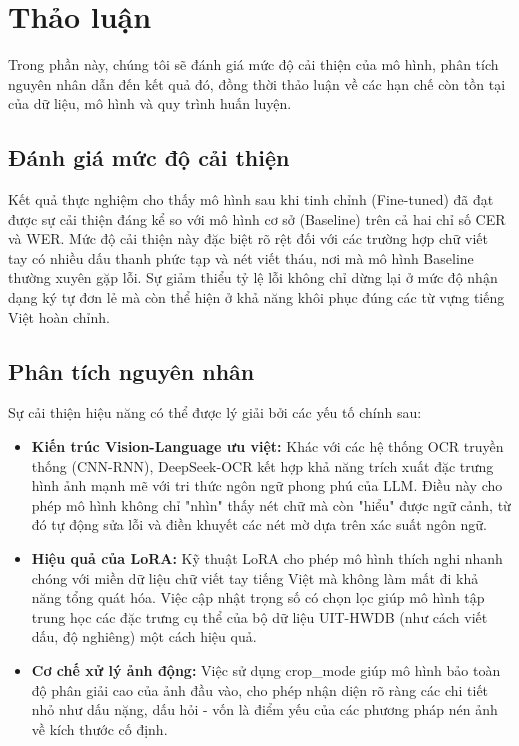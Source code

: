 \section{Thảo luận}

Trong phần này, chúng tôi sẽ đánh giá mức độ cải thiện của mô hình, phân tích nguyên nhân dẫn đến kết quả đó, đồng thời thảo luận về các hạn chế còn tồn tại của dữ liệu, mô hình và quy trình huấn luyện.

\subsection{Đánh giá mức độ cải thiện}

Kết quả thực nghiệm cho thấy mô hình sau khi tinh chỉnh (Fine-tuned) đã đạt được sự cải thiện đáng kể so với mô hình cơ sở (Baseline) trên cả hai chỉ số CER và WER. Mức độ cải thiện này đặc biệt rõ rệt đối với các trường hợp chữ viết tay có nhiều dấu thanh phức tạp và nét viết tháu, nơi mà mô hình Baseline thường xuyên gặp lỗi. Sự giảm thiểu tỷ lệ lỗi không chỉ dừng lại ở mức độ nhận dạng ký tự đơn lẻ mà còn thể hiện ở khả năng khôi phục đúng các từ vựng tiếng Việt hoàn chỉnh.

\subsection{Phân tích nguyên nhân}

Sự cải thiện hiệu năng có thể được lý giải bởi các yếu tố chính sau:

\begin{itemize}
    \item \textbf{Kiến trúc Vision-Language ưu việt:} Khác với các hệ thống OCR truyền thống (CNN-RNN), DeepSeek-OCR kết hợp khả năng trích xuất đặc trưng hình ảnh mạnh mẽ với tri thức ngôn ngữ phong phú của LLM. Điều này cho phép mô hình không chỉ "nhìn" thấy nét chữ mà còn "hiểu" được ngữ cảnh, từ đó tự động sửa lỗi và điền khuyết các nét mờ dựa trên xác suất ngôn ngữ.
    \item \textbf{Hiệu quả của LoRA:} Kỹ thuật LoRA cho phép mô hình thích nghi nhanh chóng với miền dữ liệu chữ viết tay tiếng Việt mà không làm mất đi khả năng tổng quát hóa. Việc cập nhật trọng số có chọn lọc giúp mô hình tập trung học các đặc trưng cụ thể của bộ dữ liệu UIT-HWDB (như cách viết dấu, độ nghiêng) một cách hiệu quả.
    \item \textbf{Cơ chế xử lý ảnh động:} Việc sử dụng crop\_mode giúp mô hình bảo toàn độ phân giải cao của ảnh đầu vào, cho phép nhận diện rõ ràng các chi tiết nhỏ như dấu nặng, dấu hỏi - vốn là điểm yếu của các phương pháp nén ảnh về kích thước cố định.
\end{itemize}

